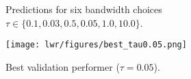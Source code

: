 \begin{answer}
\begin{figure}[htbp]
  \caption{Predictions for six bandwidth choices $\tau \in \{0.1,0.03,0.5,0.05,1.0,10.0\}$. }
  \label{fig:lwr_grid}
\end{figure}

\begin{figure}[htbp]
  \centering
  \texttt{[image: lwr/figures/best\_tau0.05.png]}
  \caption{Best validation performer ($\tau = 0.05$). }
  \label{fig:lwr_best_tau}
\end{figure}

\end{answer}
